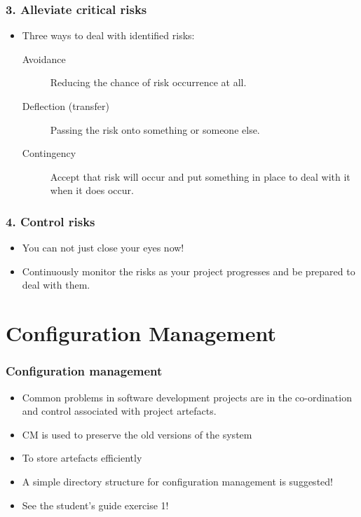 \documentclass{beamer}
\begin{document}
\begin{frame}[t]\frametitle{3. Alleviate critical risks}
 \begin{itemize}
        \item Three ways to deal with identified risks:
        \begin{description}
            \item [Avoidance] Reducing the chance of risk occurrence at all.
            \item [Deflection (transfer)] Passing the risk onto something or someone else.
            \item [Contingency] Accept that risk will occur and put something in place to deal with it when it does occur.
        \end{description}
    \end{itemize}
\end{frame}

\begin{frame}[t]\frametitle{4. Control risks}
    \begin{itemize}
        \item You can not just close your eyes now!
        \item Continuously monitor the risks as your project progresses and be prepared to deal with them.
    \end{itemize}
\end{frame}


\section{Configuration Management} %
\label{sec:configuration_management}

\begin{frame}[t]\frametitle{Configuration management}
    \begin{itemize}
        \item Common problems in software development projects are in the co-ordination and control associated with project artefacts.
        \item CM is used to preserve the old versions of the system
        \item To store artefacts efficiently
        \item A simple directory structure for configuration management is suggested!
        \item See the student's guide exercise 1!
    \end{itemize}
\end{frame}
\end{document}
